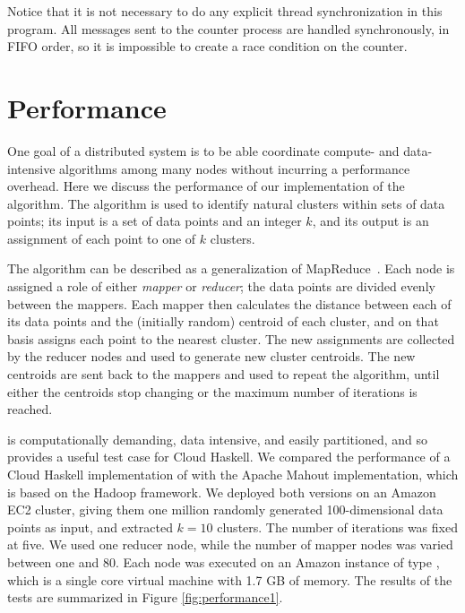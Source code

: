 \documentclass{sigplanconf}
\begin{document}
Notice that it is not necessary to do any explicit thread synchronization in this program. All messages sent to the counter process are handled synchronously, in FIFO order, so it is impossible to create a race condition on the counter.

\section{Performance}
\label{s:performance}

One goal of a distributed system is to be able coordinate compute- and data-intensive algorithms among many nodes without incurring a performance overhead. Here we discuss the performance of our implementation of the \kmeans{} algorithm. The algorithm is used to identify natural clusters within sets of data points; its input is a set of data points and an integer $k$, and its output is an assignment of each point to one of $k$ clusters.

The \kmeans{} algorithm can be described as a generalization of MapReduce~\cite{MapReduce2008}. Each node is assigned a role of either {\em mapper} or {\em reducer}; the data points are divided evenly between the mappers. Each mapper then calculates the distance between each of its data points and the (initially random) centroid of each cluster, and on that basis assigns each point to the nearest cluster. The new assignments are collected by the reducer nodes and used to generate new cluster centroids. The new centroids are sent back to the mappers and used to repeat the algorithm, until either the centroids stop changing or the maximum number of iterations is reached.

\kmeans{} is computationally demanding, data intensive, and easily partitioned, and so provides a useful test case for Cloud Haskell. We compared the performance of a Cloud Haskell implementation of \kmeans{} with the Apache Mahout implementation, which is based on the Hadoop framework. We deployed both versions on an Amazon EC2 cluster, giving them one million randomly generated 100-dimensional data points as input, and extracted $k=10$ clusters. The number of iterations was fixed at five. We used one reducer node, while the number of mapper nodes was varied between one and 80. Each node was executed on an Amazon instance of type , which is a single core virtual machine with 1.7 GB of memory. The results of the tests are summarized in Figure \ref{fig:performance1}.
\end{document}
